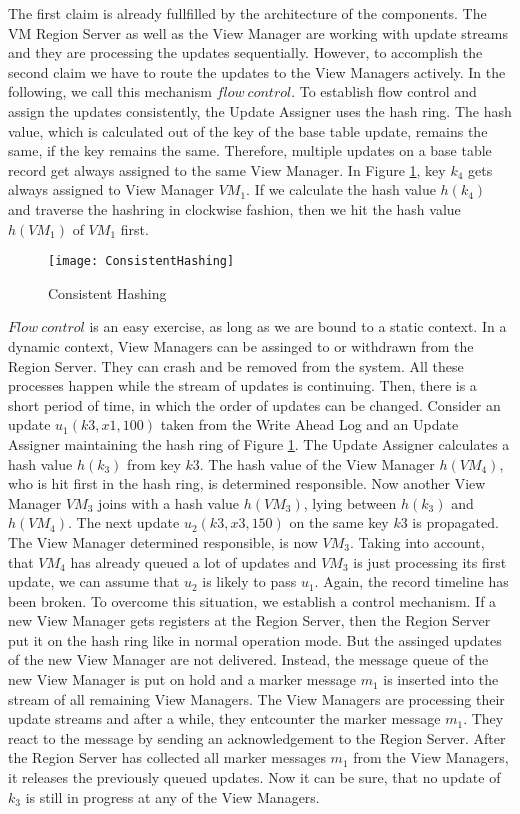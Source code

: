 \documentclass[11pt,a4paper,bibtotoc,idxtotoc,headsepline,footsepline,footexclude,BCOR12mm,DIV13]{scrbook}
\begin{document}
The first claim is already fullfilled by the architecture of the components. The VM Region Server as well as the View Manager are working with update streams and they are processing the updates sequentially. However, to accomplish the second claim we have to route the updates to the View Managers actively. In the following, we call this mechanism $flow\:control$. To establish flow control and assign the updates consistently, the Update Assigner uses the hash ring. The hash value, which is calculated out of the key of the base table update, remains the same, if the key remains the same. Therefore, multiple updates on a base table record get always assigned to the same View Manager. In Figure \ref{fig:consistentHashing}, key $k_4$ gets always assigned to View Manager $VM_1$. If we calculate the hash value $h(k_4)$ and traverse the hashring in clockwise fashion, then we hit the hash value $h(VM_1)$ of $VM_1$ first.
\begin{figure}[h!]
  
  \centering
    \texttt{[image: ConsistentHashing]}
    \caption{Consistent Hashing}
    \label{fig:consistentHashing}
\end{figure}

$Flow\:control$ is an easy exercise, as long as we are bound to a static context. In a dynamic context, View Managers can be assinged to or withdrawn from the Region Server. They can crash and be removed from the system. All these processes happen while the stream of updates is continuing. Then, there is a short period of time, in which the order of updates can be changed. Consider an update $u_1(k3, x1, 100)$ taken from the Write Ahead Log and an Update Assigner maintaining the hash ring of Figure \ref{fig:consistentHashing}. The Update Assigner calculates a hash value $h(k_3)$ from key $k3$. The hash value of the View Manager $h(VM_4)$, who is hit first in the hash ring, is determined responsible. Now another View Manager $VM_3$ joins with a hash value $h(VM_3)$, lying between $h(k_3)$ and $h(VM_4)$. The next update $u_2(k3, x3, 150)$ on the same key $k3$ is propagated. The View Manager determined responsible, is now $VM_3$. Taking into account, that $VM_4$ has already queued a lot of updates and $VM_3$ is just processing its first update, we can assume that $u_2$ is likely to pass $u_1$. Again, the record timeline has been broken. To overcome this situation, we establish a control mechanism. If a new View Manager gets registers at the Region Server, then the Region Server put it on the hash ring like in normal operation mode. But the assinged updates of the new View Manager are not delivered.  Instead, the message queue of the new View Manager is put on hold and a marker message $m_1$ is inserted into the stream of all remaining View Managers. The View Managers are processing their update streams and after a while, they entcounter the marker message $m_1$. They react to the message by sending an acknowledgement to the Region Server. After the Region Server has collected all marker messages $m_1$ from the View Managers, it releases the previously queued updates. Now it can be sure, that no update of $k_3$ is still in progress at any of the View Managers.\\   
\end{document}
